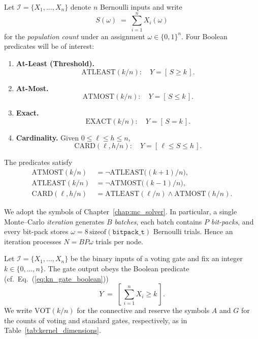 Let $\mathcal{I}=\{X_1,\dots,X_n\}$ denote $n$ Bernoulli inputs and
write
\[
  S(\omega) \;=\; \sum_{i=1}^{n} X_i(\omega)
\]
for the \emph{population count} under an assignment
$\omega \in \{0,1\}^{n}$.  Four Boolean predicates will be of interest:
\begin{enumerate}
  \item \textbf{At-Least (Threshold).}
        \[
          \mathrm{ATLEAST}(k/n):\quad
          Y = [\,S \ge k\,].
        \]
  \item \textbf{At-Most.}
        \[
          \mathrm{ATMOST}(k/n):\quad
          Y = [\,S \le k\,].
        \]
  \item \textbf{Exact.}
        \[
          \mathrm{EXACT}(k/n):\quad
          Y = [\,S = k\,].
        \]
  \item \textbf{Cardinality.}
        Given $0 \le \ell \le h \le n$,
        \[
          \mathrm{CARD}(\ell,h/n):\quad
          Y = [\,\ell \le S \le h\,].
        \]
\end{enumerate}
The predicates satisfy
\begin{align}
  \mathrm{ATMOST}(k/n)
    &= \lnot \mathrm{ATLEAST}\bigl((k+1)/n\bigr),\label{eq:atm_alt}\\
  \mathrm{ATLEAST}(k/n)
    &= \lnot \mathrm{ATMOST}\bigl((k-1)/n\bigr),\label{eq:alt_atm}\\
  \mathrm{CARD}(\ell,h/n)
    &= \mathrm{ATLEAST}(\ell/n) \land \mathrm{ATMOST}(h/n).
    \label{eq:card_identity}
\end{align}



We adopt the symbols of Chapter~\ref{chap:mc_solver}.  In particular, a single
Monte–Carlo \emph{iteration} generates $B$ \emph{batches}, each batch contains
$P$ \emph{bit-packs}, and every bit-pack stores $\omega=8\,\mathrm{sizeof}(\texttt{bitpack\_t})$
Bernoulli trials.  Hence an iteration processes
\(
  N = B P \omega
\)
trials per node.

Let $\mathcal{I}=\{X_1,\dots,X_n\}$ be the binary inputs of a voting gate and
fix an integer $k\in\{0,\dots,n\}$.  The gate output obeys the Boolean
predicate (cf.~Eq.~(\ref{eq:kn_gate_boolean}))
\[
  Y\;=\;[\,\sum_{i=1}^{n} X_i \ge k\,].
\]
We write $\mathrm{VOT}(k/n)$ for the connective and reserve the symbols
$A$ and $G$ for the counts of voting and standard gates, respectively, as in
Table~\ref{tab:kernel_dimensions}.

